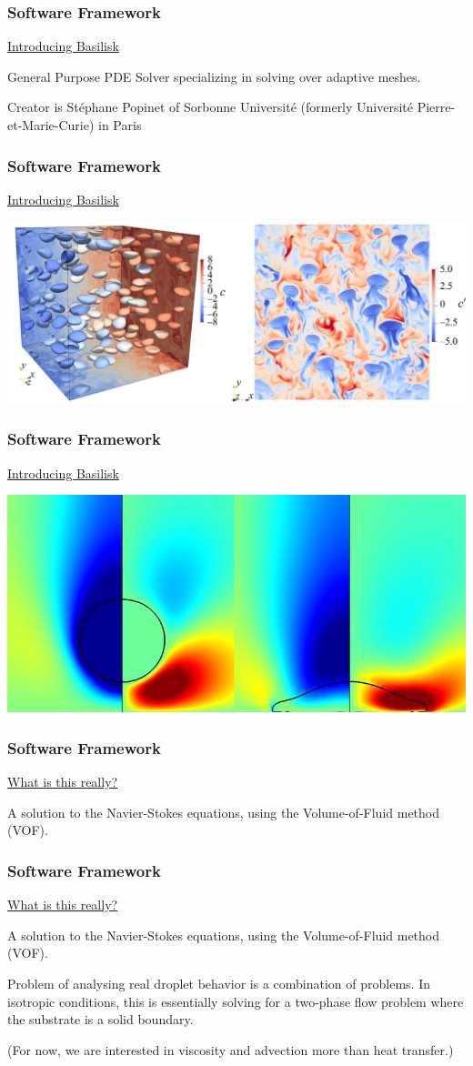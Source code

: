 \documentclass[12pt]{beamer}
\begin{document}
\begin{frame}
    \frametitle{Software Framework}
    \underline{Introducing Basilisk}

    General Purpose PDE Solver specializing in solving over adaptive meshes.

    Creator is Stéphane Popinet of Sorbonne Université (formerly Université Pierre-et-Marie-Curie) in Paris
\end{frame}
\begin{frame}
    \frametitle{Software Framework}
    \underline{Introducing Basilisk}

    \includegraphics[width=\textwidth]{img/3-hidman2023.jpg}
\end{frame}
\begin{frame}
    \frametitle{Software Framework}
    \underline{Introducing Basilisk}

    \includegraphics[width=\textwidth]{img/4-drop.png}
\end{frame}
\begin{frame}
    \frametitle{Software Framework}
    \underline{What is this really?}

    A solution to the Navier-Stokes equations,
    using the Volume-of-Fluid method (VOF).
\end{frame}
\begin{frame}
    \frametitle{Software Framework}
    \underline{What is this really?}

    A solution to the Navier-Stokes equations,
    using the Volume-of-Fluid method (VOF).

    Problem of analysing real droplet behavior is a combination of problems. In 
    isotropic conditions, this is essentially solving for a two-phase flow 
    problem where the substrate is a solid boundary.

    (For now, we are interested in viscosity and advection more than heat 
    transfer.)
\end{frame}
\end{document}
